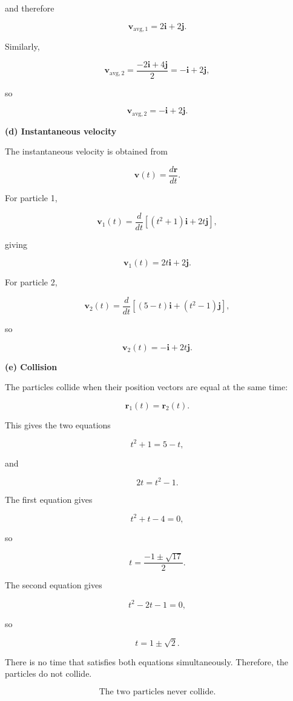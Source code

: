 \documentclass[12pt]{article}
\theoremstyle{remark}
\begin{document}
and therefore

\[
\boxed{
\mathbf{v}_{\mathrm{avg},1}
=
2\mathbf{i}+2\mathbf{j}.
}
\]

Similarly,

\[
\mathbf{v}_{\mathrm{avg},2}
=
\frac{-2\mathbf{i}+4\mathbf{j}}{2}
=
-\mathbf{i}+2\mathbf{j},
\]

so

\[
\boxed{
\mathbf{v}_{\mathrm{avg},2}
=
-\mathbf{i}+2\mathbf{j}.
}
\]

\textbf{(d) Instantaneous velocity}

The instantaneous velocity is obtained from

\[
\mathbf{v}(t)=\frac{d\mathbf{r}}{dt}.
\]

For particle 1,

\[
\mathbf{v}_1(t)
=
\frac{d}{dt}
\left[
(t^2+1)\mathbf{i}+2t\mathbf{j}
\right],
\]

giving

\[
\boxed{
\mathbf{v}_1(t)
=
2t\mathbf{i}+2\mathbf{j}.
}
\]

For particle 2,

\[
\mathbf{v}_2(t)
=
\frac{d}{dt}
\left[
(5-t)\mathbf{i}+(t^2-1)\mathbf{j}
\right],
\]

so

\[
\boxed{
\mathbf{v}_2(t)
=
-\mathbf{i}+2t\mathbf{j}.
}
\]

\textbf{(e) Collision}

The particles collide when their position vectors are equal at the same time:

\[
\mathbf{r}_1(t)=\mathbf{r}_2(t).
\]

This gives the two equations

\[
t^2+1=5-t,
\]

and

\[
2t=t^2-1.
\]

The first equation gives

\[
t^2+t-4=0,
\]

so

\[
t=\frac{-1\pm\sqrt{17}}{2}.
\]

The second equation gives

\[
t^2-2t-1=0,
\]

so

\[
t=1\pm\sqrt{2}.
\]

There is no time that satisfies both equations simultaneously. Therefore, the particles do not collide.

\[
\boxed{\text{The two particles never collide.}}
\]
\end{document}
